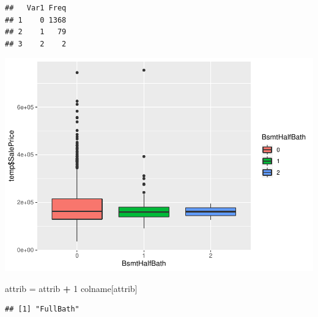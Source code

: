 \documentclass[]{article}
\newenvironment{Shaded}{\begin{snugshade}}{\end{snugshade}}
\newcommand{\DecValTok}[1]{\textcolor[rgb]{0.00,0.00,0.81}{#1}}
\newcommand{\StringTok}[1]{\textcolor[rgb]{0.31,0.60,0.02}{#1}}
\newcommand{\OperatorTok}[1]{\textcolor[rgb]{0.81,0.36,0.00}{\textbf{#1}}}
\newcommand{\NormalTok}[1]{#1}
\begin{document}
\begin{verbatim}
##   Var1 Freq
## 1    0 1368
## 2    1   79
## 3    2    2
\end{verbatim}

\includegraphics{EDA_files/figure-latex/unnamed-chunk-71-1.pdf}

\begin{Shaded}
\begin{Highlighting}[]
\NormalTok{attrib =}\StringTok{ }\NormalTok{attrib }\OperatorTok{+}\StringTok{ }\DecValTok{1}
\NormalTok{colname[attrib]}
\end{Highlighting}
\end{Shaded}

\begin{verbatim}
## [1] "FullBath"
\end{verbatim}
\end{document}
